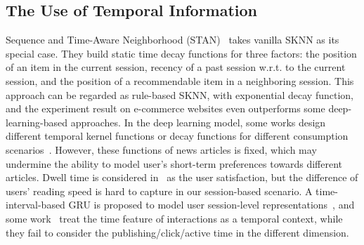 \subsection{The Use of Temporal Information}
Sequence and Time-Aware Neighborhood (STAN)~\cite{garg2019sequence} takes vanilla SKNN as its special case. They build static time decay functions for three factors: the position of an item in the current session, recency of a past session w.r.t. to the current session, and the position of a recommendable item in a neighboring session. This approach can be regarded as rule-based SKNN, with exponential decay function, and the experiment result on e-commerce websites even outperforms some deep-learning-based approaches. 
In the deep learning model, some works design different temporal kernel functions or decay functions for different consumption scenarios~\cite{wang2020make,wu2020deja,zhang2019dynamic}. However, these functions of news articles is fixed, which may undermine the ability to model user's short-term preferences towards different articles. Dwell time is considered in~\cite{wu2020CPRS} as the user satisfaction, but the difference of users' reading speed is hard to capture in our session-based scenario. A time-interval-based GRU is proposed to model user session-level representations~\cite{lei_tissa_2019}, and some work~\cite{rakkappan2019context,xu2019time,wu_recommender_2019} treat the time feature of interactions as a temporal context, while they fail to consider the publishing/click/active time in the different dimension.
